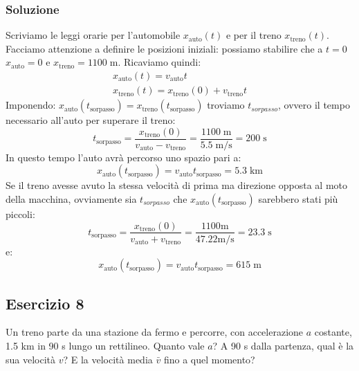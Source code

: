 \documentclass[12pt,a4paper]{book}
\begin{document}
\subsubsection*{Soluzione}
Scriviamo le leggi orarie per l'automobile $x_{\text{auto}}(t)$ e per il treno $x_{\text{treno}}(t)$. Facciamo attenzione a definire le posizioni iniziali: possiamo stabilire che a $t=0$ $x_{\text{auto}}=0$ e $x_{\text{treno}}=1100\;\text{m}$. Ricaviamo quindi:
\begin{eqnarray*}
      x_{\text{auto}}(t)=v_{\text{auto}}t\\ 
   x_{\text{treno}}(t)= x_{\text{treno}}(0)+v_{\text{treno}}t
  \end{eqnarray*}
Imponendo: $x_{\text{auto}}(t_{\text{sorpasso}})=x_{\text{treno}}(t_{\text{sorpasso}})$ troviamo $t_{sorpasso}$, ovvero il tempo necessario all'auto per superare il treno:
\begin{equation*}
t_{\text{sorpasso}}=\frac{x_{\text{treno}}(0)}{v_{\text{auto}}-v_{\text{treno}}}=\frac{1100 \;\text{m}}{5.5\;\text{m/s}}=200\;\text{s}
\end{equation*}
In questo tempo l'auto avrà percorso uno spazio pari a:
\begin{equation*}
x_{\text{auto}}(t_{\text{sorpasso}})=v_{\text{auto}}t_{\text{sorpasso}}=5.3 \; \text{km}
\end{equation*}
Se il treno avesse avuto la stessa velocità di prima ma direzione opposta al moto della macchina, ovviamente sia $t_{sorpasso}$ che $x_{\text{auto}}(t_{\text{sorpasso}})$ sarebbero stati più piccoli:
\begin{equation*}
t_{\text{sorpasso}}=\frac{x_{\text{treno}}(0)}{v_{\text{auto}}+v_{\text{treno}}}=\frac{1100 \text{m}}{47.22 \text{m/s}}=23.3 \;\text{s}
\end{equation*}
e:
\begin{equation*}
 x_{\text{auto}}(t_{\text{sorpasso}})=v_{\text{auto}}t_{\text{sorpasso}}=615\; \text{m}
\end{equation*}

\subsection*{Esercizio 8}
Un treno parte da una stazione da fermo e percorre, con accelerazione $a$ costante, 1.5 km in 90 s lungo un rettilineo. Quanto vale $a$? A 90 s dalla partenza, qual è la sua velocità $v$? E la velocità media $\bar{v}$ fino a quel momento?
\end{document}
